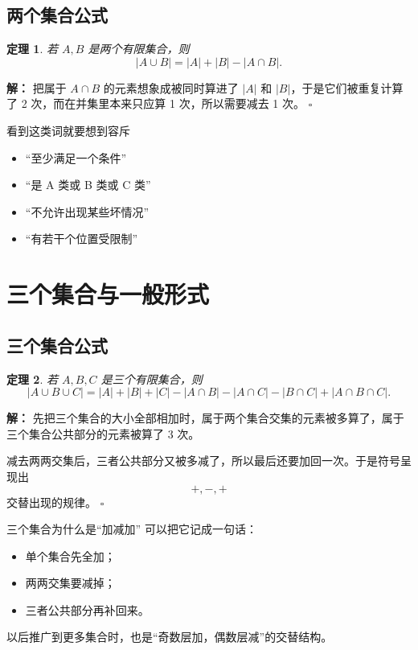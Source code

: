 \documentclass[11pt,a4paper,fontset=fandol]{ctexart}
\theoremstyle{formaltheorem}
\newtheorem{theorem}{定理}[section]
\theoremstyle{formalexample}
\newenvironment{solution}{\par\noindent\textbf{解：}}{\hfill$\square$\par}
\begin{document}
\subsection{两个集合公式}

\begin{theorem}
若 $A,B$ 是两个有限集合，则
\[
|A\cup B|=|A|+|B|-|A\cap B|.
\]
\end{theorem}

\begin{solution}
把属于 $A\cap B$ 的元素想象成被同时算进了 $|A|$ 和 $|B|$，于是它们被重复计算了 2 次，而在并集里本来只应算 1 次，所以需要减去 1 次。
\end{solution}

\begin{skillbox}{看到这类词就要想到容斥}
\begin{itemize}
  \item “至少满足一个条件”
  \item “是 A 类或 B 类或 C 类”
  \item “不允许出现某些坏情况”
  \item “有若干个位置受限制”
\end{itemize}
\end{skillbox}

\section{三个集合与一般形式}

\subsection{三个集合公式}

\begin{theorem}
若 $A,B,C$ 是三个有限集合，则
\[
|A\cup B\cup C|
=|A|+|B|+|C|-|A\cap B|-|A\cap C|-|B\cap C|+|A\cap B\cap C|.
\]
\end{theorem}

\begin{solution}
先把三个集合的大小全部相加时，属于两个集合交集的元素被多算了，属于三个集合公共部分的元素被算了 3 次。

减去两两交集后，三者公共部分又被多减了，所以最后还要加回一次。于是符号呈现出
\[
+,-,+
\]
交替出现的规律。
\end{solution}

\begin{notebox}{三个集合为什么是“加减加”}
可以把它记成一句话：
\begin{itemize}
  \item 单个集合先全加；
  \item 两两交集要减掉；
  \item 三者公共部分再补回来。
\end{itemize}
以后推广到更多集合时，也是“奇数层加，偶数层减”的交替结构。
\end{notebox}
\end{document}
